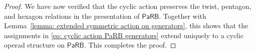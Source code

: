 \documentclass{amsart}
\newcommand{\PaRB}{\mathsf{PaRB}}
\theoremstyle{definition}
\numberwithin{equation}{section}
\begin{document}
\begin{proof}

We have now verified that the cyclic action preserves the twist,
pentagon, and hexagon relations in the presentation of $\PaRB$.
Together with
Lemma~\ref{lemma: extended symmetric action on generators}, this shows
that the assignments in
\eqref{eq: cyclic action PaRB generators} extend uniquely to a cyclic
operad structure on $\PaRB$. This completes the proof.
\end{proof}
\end{document}
